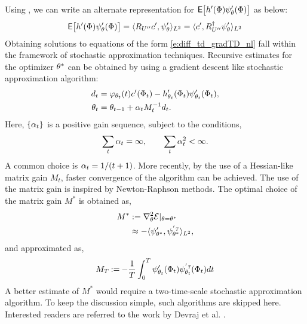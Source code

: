 Using , we can write an alternate representation for ${\sf E} \bigl[ h'(\Phi)\psi'_\theta (\Phi)\bigr]$ as below:
\begin{eqnarray*}
	{\sf E}\bigl[h'(\Phi)\psi'_\theta (\Phi)\bigr]=\langle R_{U''}c',\psi'_\theta\rangle_{L^2} =\langle c', R_{U''}^\dagger \psi'_\theta\rangle_{L^2}
\end{eqnarray*}
Obtaining solutions to equations of the form \eqref{e:diff_td_gradTD_nl} fall within the framework of stochastic approximation techniques. Recursive estimates for the optimizer $\theta^*$ can be obtained by using a gradient descent like stochastic approximation algorithm: %
\begin{equation}
\begin{aligned} 
d_t & =\eligibvector_{\param_t}(t)  c'(\markovstate_t)- h'_{\param_{t}}(\markovstate_t)\basis'_{\param_{t}}(\markovstate_t), \\
\param_t &=\param_{t-1} + \sagain_t M_{t}^{-1} d_t. 
\label{e:diff_td_gradTD_theta_sa}
\end{aligned}
\end{equation}
Here, $\{\alpha_t\}$ is a positive gain sequence, subject to the conditions, 
\begin{equation}
\sum_t \alpha_t = \infty, \qquad \sum_t \alpha_t^2 < \infty.
\end{equation}
A common choice is $\alpha_t = 1/(t+1)$. More recently, by the use of a Hessian-like matrix gain $M_t$, faster convergence of the algorithm can be achieved. The use of the matrix gain is inspired by Newton-Raphson methods. The optimal choice of the matrix gain $M^*$ is obtained as, 
\begin{equation}
\begin{aligned}
M^* &:= \nabla^2_{\theta}\mathcal{E}|_{\theta = \theta^*}\\
& \approx  - \langle \psi'_{\theta^*}, \psi_{\theta^*}^{'{\hbox{\tiny\it T}}} \rangle_{L^2}, 
\end{aligned}
\end{equation} 
and approximated as,
\begin{equation}
M_T  \mathbin{:=}  - \frac{1}{T} \int_0^T \psi'_{\theta_t}(\Phi_t) \psi^{'{\hbox{\tiny\it T}}}_{\theta_t}(\Phi_t) dt
\end{equation}
A better estimate of $M^*$ would require a two-time-scale stochastic approximation algorithm. To keep the discussion simple, such algorithms are skipped here. Interested readers are referred to the work by Devraj et al. \cite{devmey17a}.
 
